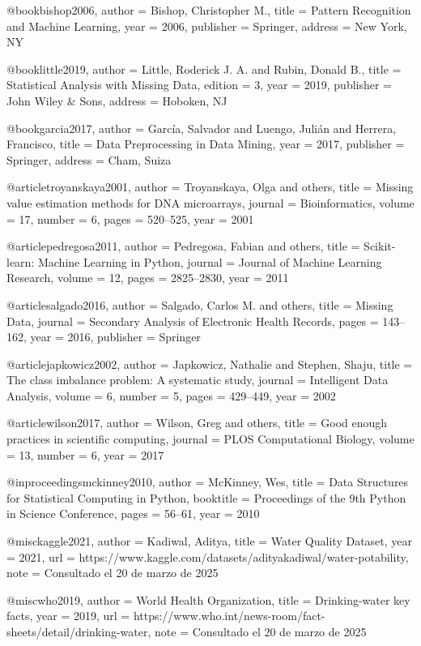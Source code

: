 @book{bishop2006,
  author    = {Bishop, Christopher M.},
  title     = {Pattern Recognition and Machine Learning},
  year      = {2006},
  publisher = {Springer},
  address   = {New York, NY}
}

@book{little2019,
  author    = {Little, Roderick J. A. and Rubin, Donald B.},
  title     = {Statistical Analysis with Missing Data},
  edition   = {3},
  year      = {2019},
  publisher = {John Wiley \& Sons},
  address   = {Hoboken, NJ}
}

@book{garcia2017,
  author    = {García, Salvador and Luengo, Julián and Herrera, Francisco},
  title     = {Data Preprocessing in Data Mining},
  year      = {2017},
  publisher = {Springer},
  address   = {Cham, Suiza}
}

@article{troyanskaya2001,
  author  = {Troyanskaya, Olga and others},
  title   = {Missing value estimation methods for {DNA} microarrays},
  journal = {Bioinformatics},
  volume  = {17},
  number  = {6},
  pages   = {520--525},
  year    = {2001}
}

@article{pedregosa2011,
  author  = {Pedregosa, Fabian and others},
  title   = {Scikit-learn: Machine Learning in {P}ython},
  journal = {Journal of Machine Learning Research},
  volume  = {12},
  pages   = {2825--2830},
  year    = {2011}
}

@article{salgado2016,
  author    = {Salgado, Carlos M. and others},
  title     = {Missing Data},
  journal   = {Secondary Analysis of Electronic Health Records},
  pages     = {143--162},
  year      = {2016},
  publisher = {Springer}
}

@article{japkowicz2002,
  author  = {Japkowicz, Nathalie and Stephen, Shaju},
  title   = {The class imbalance problem: A systematic study},
  journal = {Intelligent Data Analysis},
  volume  = {6},
  number  = {5},
  pages   = {429--449},
  year    = {2002}
}

@article{wilson2017,
  author  = {Wilson, Greg and others},
  title   = {Good enough practices in scientific computing},
  journal = {PLOS Computational Biology},
  volume  = {13},
  number  = {6},
  year    = {2017}
}

@inproceedings{mckinney2010,
  author    = {McKinney, Wes},
  title     = {Data Structures for Statistical Computing in Python},
  booktitle = {Proceedings of the 9th Python in Science Conference},
  pages     = {56--61},
  year      = {2010}
}

@misc{kaggle2021,
  author = {Kadiwal, Aditya},
  title  = {Water Quality Dataset},
  year   = {2021},
  url    = {https://www.kaggle.com/datasets/adityakadiwal/water-potability},
  note   = {Consultado el 20 de marzo de 2025}
}

@misc{who2019,
  author = {{World Health Organization}},
  title  = {Drinking-water key facts},
  year   = {2019},
  url    = {https://www.who.int/news-room/fact-sheets/detail/drinking-water},
  note   = {Consultado el 20 de marzo de 2025}
}
